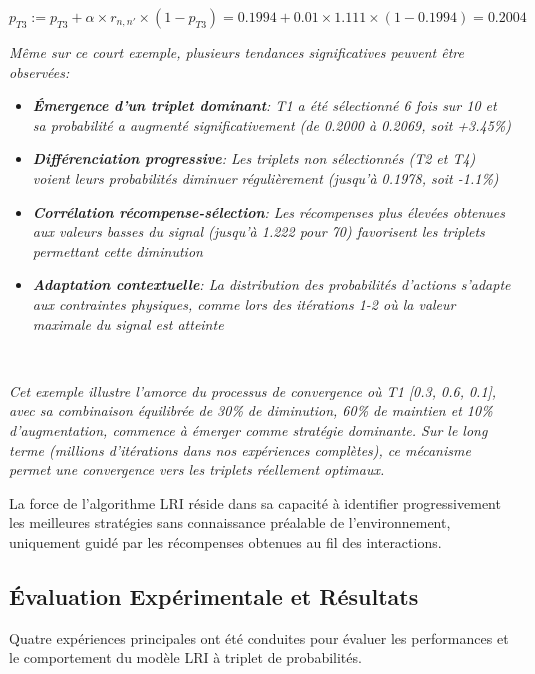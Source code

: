 \documentclass[a4paper,11pt]{article}
\begin{document}
\begin{mdframed}
\[
  p_{T3} := p_{T3} + \alpha \times r_{n,n'} \times (1 - p_{T3})
  = 0.1994 + 0.01 \times 1.111 \times (1 - 0.1994) = 0.2004
\]

{\small\itshape
Même sur ce court exemple, plusieurs tendances significatives peuvent être observées:
}
\begin{itemize}
    \item {\small\itshape \textbf{Émergence d'un triplet dominant}: T1 a été sélectionné 6 fois sur 10 et sa probabilité a augmenté significativement (de 0.2000 à 0.2069, soit +3.45\%)}
    
    \item {\small\itshape \textbf{Différenciation progressive}: Les triplets non sélectionnés (T2 et T4) voient leurs probabilités diminuer régulièrement (jusqu'à 0.1978, soit -1.1\%)}
    
    \item {\small\itshape \textbf{Corrélation récompense-sélection}: Les récompenses plus élevées obtenues aux valeurs basses du signal (jusqu'à 1.222 pour 70) favorisent les triplets permettant cette diminution}
    
    \item {\small\itshape \textbf{Adaptation contextuelle}: La distribution des probabilités d'actions s'adapte aux contraintes physiques, comme lors des itérations 1-2 où la valeur maximale du signal est atteinte}
\end{itemize}
\
{\small\itshape
Cet exemple illustre l'amorce du processus de convergence où T1 [0.3, 0.6, 0.1], avec sa combinaison équilibrée de 30\% de diminution, 60\% de maintien et 10\% d'augmentation, commence à émerger comme stratégie dominante. Sur le long terme (millions d'itérations dans nos expériences complètes), ce mécanisme permet une convergence vers les triplets réellement optimaux.

La force de l'algorithme LRI réside dans sa capacité à identifier progressivement les meilleures stratégies sans connaissance préalable de l'environnement, uniquement guidé par les récompenses obtenues au fil des interactions.}
\end{mdframed}
\clearpage
\subsection{Évaluation Expérimentale et Résultats}

Quatre expériences principales ont été conduites pour évaluer les performances et le comportement du modèle LRI à triplet de probabilités.
\end{document}
